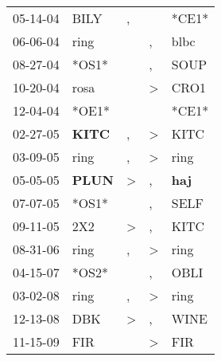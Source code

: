 \begin{supertabular}{p{0.07\textwidth}p{0.06\textwidth}p{0.02\textwidth}p{0.02\textwidth}p{0.06\textwidth}}
          05-14-04\textsuperscript{} &           BILY\textsuperscript{} &             , &               &                            *CE1* \\
          06-06-04\textsuperscript{} &           ring\textsuperscript{} &               &             , &           blbc\textsuperscript{} \\
          08-27-04\textsuperscript{} &                            *OS1* &               &             , &           SOUP\textsuperscript{} \\
          10-20-04\textsuperscript{} &           rosa\textsuperscript{} &               &  \textgreater &           CRO1\textsuperscript{} \\
          12-04-04\textsuperscript{} &                            *OE1* &               &               &                            *CE1* \\
          02-27-05\textsuperscript{} &  \textbf{KITC\textsuperscript{}} &             , &  \textgreater &           KITC\textsuperscript{} \\
          03-09-05\textsuperscript{} &           ring\textsuperscript{} &             , &  \textgreater &           ring\textsuperscript{} \\
          05-05-05\textsuperscript{} &  \textbf{PLUN\textsuperscript{}} &  \textgreater &             , &   \textbf{haj\textsuperscript{}} \\
          07-07-05\textsuperscript{} &                            *OS1* &               &             , &           SELF\textsuperscript{} \\
          09-11-05\textsuperscript{} &            2X2\textsuperscript{} &  \textgreater &             , &           KITC\textsuperscript{} \\
          08-31-06\textsuperscript{} &           ring\textsuperscript{} &             , &  \textgreater &           ring\textsuperscript{} \\
          04-15-07\textsuperscript{} &                            *OS2* &               &             , &           OBLI\textsuperscript{} \\
          03-02-08\textsuperscript{} &           ring\textsuperscript{} &             , &  \textgreater &           ring\textsuperscript{} \\
          12-13-08\textsuperscript{} &            DBK\textsuperscript{} &  \textgreater &             , &           WINE\textsuperscript{} \\
          11-15-09\textsuperscript{} &            FIR\textsuperscript{} &               &  \textgreater &            FIR\textsuperscript{} \\

\end{supertabular}
